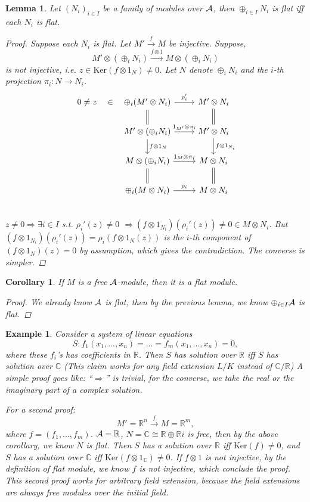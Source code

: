 \documentclass[11pt]{article}
\newtheorem{lemma}[thm]{Lemma}
\newtheorem{cor}[thm]{Corollary}
\newtheorem{ex}[thm]{Example}
\newcommand{\reals}{\mathbb R}
\newcommand{\cplx}{\mathbb C}
\newcommand{\cala}{{\cal A}}
\newcommand{\Lrta}{\Longrightarrow}
\newcommand{\lrta}{\longrightarrow}
\begin{document}
\begin{lemma}
Let $(N_i)_{i\in I}$ be a family of modules over $\cala$, then $\oplus_{i\in I} N_i$ is flat iff each $N_i$ is flat.
\begin{proof}
Suppose each $N_i$ is flat. Let $M'\overset{f}{\lrta}M$ be injective. Suppose, 
$$
M'\otimes(\oplus_{i}N_i)\overset{f\otimes 1}{\lrta}M\otimes (\oplus_i N_i) 
$$
is not injective, i.e.  $z\in \text{Ker}(f\otimes 1_N)\neq 0$. 
Let $N$ denote $\oplus_i N_i$ and the $i$-th projection $\pi_i:N\lrta N_i$.
\[
\begin{tikzcd}
0\neq z\arrow[r,phantom,"\in"] & \oplus_i (M'\otimes N_i)\arrow[r,"\rho_i'"] \arrow[d,equal] & M'\otimes N_i\arrow[d,equal] \\
& M'\otimes(\oplus_i N_i)\arrow[r,"1_{M'}\otimes \pi_i"] \arrow[d,"f\otimes 1_N"] & M'\otimes N_i \arrow[d,"f\otimes 1_{N_i}"] \\
& M\otimes (\oplus_i N_i)\arrow[r,"1_M\otimes \pi_i"] & M\otimes  N_i\\
& \oplus_i (M\otimes N_i)\arrow[r,"\rho_i"] \arrow[u,equal] & M\otimes N_i\arrow[u,equal] \\
\end{tikzcd}
\]
$z\neq 0\Lrta \exists i\in I$ s.t. $\rho_i'(z)\neq0$ $\Lrta (f\otimes 1_{N_i})(\rho_i'(z))\neq0\in M\otimes N_i$.
But $(f\otimes 1_{N_i})(\rho_i'(z))=\rho_i(f\otimes 1_{N}(z))$ is the $i$-th component of $(f\otimes1_N)(z)=0$ by assumption, which gives the contradiction.
The converse is simpler.
\end{proof} 
\end{lemma}
\begin{cor}
If $M$ is a free $\cala$-module, then it is a flat module.
\begin{proof}
We already know $\cala$ is flat, then by the previous lemma, we know $\oplus_{i\in I}\cala$ is flat.
\end{proof}
\end{cor}

\begin{ex}
Consider a system of linear equations
$$
S:f_1(x_1,...,x_n)=...=f_m(x_1,...,x_n)=0,
$$
where these $f_i$'s has coefficients in $\reals$. Then $S$ has solution over $\reals$ iff $S$ has solution over $\cplx$ (This claim works for any field extension $L/K$ instead of  $\cplx/\reals$)
A simple proof goes like: ``$\Lrta$'' is trivial, for the converse, we take the real or the imaginary part of a complex solution. 

For a second proof:
$$
M'=\reals^n\overset{f}{\lrta} M=\reals^m,
$$
where $f=(f_1,...,f_m)$.
$\cala=\reals$, $ N=\cplx\cong \reals\oplus \reals i$ is free, then by the above corollary, we know $N$ is flat.
Then $S$ has a solution over $\reals$ iff $\text{Ker}(f)\neq 0$, and $S$ has a solution over $\cplx$ iff $\text{Ker}(f\otimes 1_\cplx)\neq 0$. If $f\otimes 1$ is not injective, by the definition of flat module, we know $f$ is not injective, which conclude the proof. This second proof works for arbitrary field extension, because the field extensions are always free modules over the initial field.
\end{ex}
\end{document}
